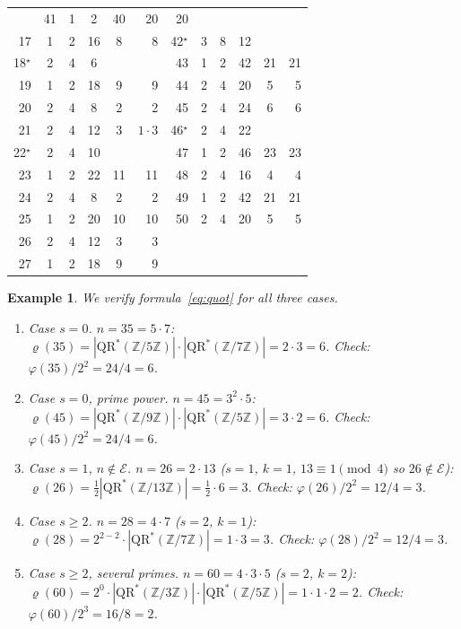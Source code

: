 \documentclass[12pt]{amsart}
\theoremstyle{bluehead}
\theoremstyle{orangehead}
\newtheorem{example}[theorem]{Example}
\theoremstyle{greenhead}
\newcommand{\Z}{\mathbb{Z}}
\newcommand{\QRS}{\mathrm{QR}^{*}}
\renewcommand{\phi}{\varphi}
\begin{document}
\begin{table}[!ht]
\begin{tabular}{@{}rccccr@{\quad}|@{\quad}rccccr@{}}
&41 & 1 & 2 & 40 & 20 & 20 \\
17 & 1 & 2 & 16 & 8 & 8
&{\color{mdred}42}$^\star$ & 3 & 8 & 12 & \color{mdred}{--} & \color{mdred}{E} \\
{\color{mdred}18}$^\star$ & 2 & 4 & 6 & \color{mdred}{--} & \color{mdred}{E}
&43 & 1 & 2 & 42 & 21 & 21 \\
19 & 1 & 2 & 18 & 9 & 9
&44 & 2 & 4 & 20 & 5 & 5 \\
20 & 2 & 4 & 8 & 2 & 2
&45 & 2 & 4 & 24 & 6 & 6 \\
21 & 2 & 4 & 12 & 3 & $1{\cdot}3$
&{\color{mdred}46}$^\star$ & 2 & 4 & 22 & \color{mdred}{--} & \color{mdred}{E} \\
{\color{mdred}22}$^\star$ & 2 & 4 & 10 & \color{mdred}{--} & \color{mdred}{E}
&47 & 1 & 2 & 46 & 23 & 23 \\
23 & 1 & 2 & 22 & 11 & 11
&48 & 2 & 4 & 16 & 4 & 4 \\
24 & 2 & 4 & 8 & 2 & 2
&49 & 1 & 2 & 42 & 21 & 21 \\
25 & 1 & 2 & 20 & 10 & 10
&50 & 2 & 4 & 20 & 5 & 5 \\
26 & 2 & 4 & 12 & 3 & 3 & & & & & & \\
27 & 1 & 2 & 18 & 9 & 9 & & & & & & \\
\bottomrule
\end{tabular}
\end{table}

\begin{example}\label{ex:examples}
  We verify formula~\eqref{eq:quot} for all three cases.
  \begin{enumerate}[label=\upshape(\alph*)]
    \item \emph{Case $s=0$.}\enspace
      $n=35=5\cdot7$: $\varrho(35)=
      |\QRS(\Z/5\Z)|\cdot|\QRS(\Z/7\Z)|=2\cdot3=6$.
      Check: $\phi(35)/2^2=24/4=6$.

    \item \emph{Case $s=0$, prime power.}\enspace
      $n=45=3^2\cdot5$: $\varrho(45)=
      |\QRS(\Z/9\Z)|\cdot|\QRS(\Z/5\Z)|=3\cdot2=6$.
      Check: $\phi(45)/2^2=24/4=6$.

    \item \emph{Case $s=1$, $n\notin\mathcal{E}$.}\enspace
      $n=26=2\cdot13$ ($s=1$, $k=1$, $13\equiv1\pmod4$ so $26\notin\mathcal{E}$):
      $\varrho(26)=\tfrac{1}{2}|\QRS(\Z/13\Z)|=\tfrac{1}{2}\cdot6=3$.
      Check: $\phi(26)/2^2=12/4=3$.

    \item \emph{Case $s\ge2$.}\enspace
      $n=28=4\cdot7$ ($s=2$, $k=1$):
      $\varrho(28)=2^{2-2}\cdot|\QRS(\Z/7\Z)|=1\cdot3=3$.
      Check: $\phi(28)/2^2=12/4=3$.

    \item \emph{Case $s\ge2$, several primes.}\enspace
      $n=60=4\cdot3\cdot5$ ($s=2$, $k=2$):
      $\varrho(60)=2^0\cdot|\QRS(\Z/3\Z)|\cdot|\QRS(\Z/5\Z)|=1\cdot1\cdot2=2$.
      Check: $\phi(60)/2^3=16/8=2$.
  \end{enumerate}
\end{example}
\end{document}
